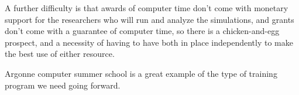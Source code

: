 \documentclass[11pt]{article}
\begin{document}
A further difficulty is that awards of computer time don't come with
monetary support for the researchers who will run and analyze the
simulations, and grants don't come with a guarantee of computer time,
so there is a chicken-and-egg prospect, and a necessity of having to
have both in place independently to make the best use of either
resource.

Argonne computer summer school is a great example of the type of training program we
need going forward.
\end{document}
